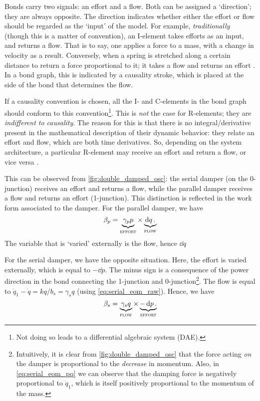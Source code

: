 Bonds carry two signals: an effort and a flow. Both can be assigned a `direction'; they are always opposite. The direction indicates whether either the effort or flow should be regarded as the `input' of the model. For example, \emph{traditionally} (though this is a matter of convention), an I-element takes efforts as an input, and returns a flow. That is to say, one applies a force to a mass, with a change in velocity as a result. Conversely, when a spring is stretched along a certain distance to return a force proportional to it; it takes a flow and returns an effort \cite{Borutzky2010}. In a bond graph, this is indicated by a causality stroke, which is placed at the side of the bond that determines the flow.

If a causality convention is chosen, all the I- and C-elements in the bond graph should conform to this convention\footnote{Not doing so leads to a differential algebraic system (DAE).}. This is \emph{not} the case for R-elements; they are \emph{indifferent to causality}. The reason for this is that there is no integral/derivative present in the mathematical description of their dynamic behavior: they relate an effort and flow, which are both time derivatives. So, depending on the system architecture, a particular R-element may receive an effort and return a flow, or vice versa \cite{Borutzky2010}.

This can be observed from \cref{fig:double_damped_osc}: the serial damper (on the 0-junction) receives an effort and returns a flow, while the parallel damper receives a flow and returns an effort (1-junction). This distinction is reflected in the work form associated to the damper. For the parallel damper, we have
\begin{equation}
     \beta_p = \underbrace{\gamma_p p}_\text{\textsc{effort}} \times \underbrace{\dd{q}.}_\text{\textsc{flow}}
\end{equation}
The variable that is `varied' externally is the flow, hence \(\dd{q}\) 

For the serial damper, we have the opposite situation. Here, the effort is varied externally, which is equal to \(-\dd{p}\). The minus sign is a consequence of the power direction in the bond connecting the 1-junction and 0-junction\footnote{Intuitively, it is clear from \cref{fig:double_damped_osc} that the force acting \emph{on} the damper is proportional to the \emph{decrease} in momentum. Also, in \cref{eq:serial_eom_pq} we can observe that the damping force is negatively proportional to \(\dot{q}_1\), which is itself positively proportional to the momentum of the mass.}. The flow is equal to \(\dot{q}_1 - \dot{q} = kq/b_s = \gamma_s q\) (using \cref{eq:serial_eom_raw}). Hence, we have
\begin{equation}
     \beta_s = \underbrace{\gamma_s q}_\text{\textsc{flow}} \times \underbrace{-\dd{p}.}_\text{\textsc{effort}}
\end{equation}

